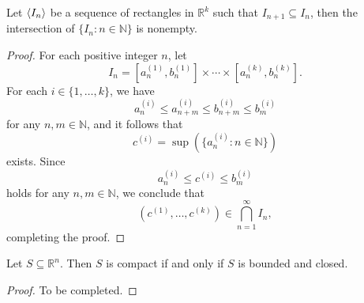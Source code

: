 \begin{theorem}
  Let $\left\langle I_n\right\rangle$ be a sequence of rectangles in $\mathbb{R}^k$ such that
  $I_{n+1} \subseteq I_n$, then the intersection of $\{I_n: n \in \mathbb{N}\}$
  is nonempty.
\end{theorem}
\begin{proof}
  For each positive integer $n$, let
  \begin{equation*}
    I_n = [a_n^{(1)}, b_n^{(1)}] \times \cdots \times
    [a_n^{(k)}, b_n^{(k)}].
  \end{equation*}
  For each $i \in \{1, \dots, k\}$, we have
  \begin{equation*}
    a_n^{(i)} \leq a_{n+m}^{(i)} \leq b_{n+m}^{(i)} \leq b_m^{(i)}
  \end{equation*}
  for any $n, m \in \mathbb{N}$, and it follows that
  \begin{equation*}
    c^{(i)} = \sup(\{a_n^{(i)}: n \in \mathbb{N}\})
  \end{equation*}
  exists.
  Since
  \begin{equation*}
    a_n^{(i)} \leq c^{(i)} \leq b_m^{(i)}
  \end{equation*}
  holds for any $n, m \in \mathbb{N}$, we conclude that
  \begin{equation*}
    (c^{(1)}, \dots, c^{(k)}) \in \bigcap_{n=1}^\infty I_n,
  \end{equation*}
  completing the proof.
\end{proof}

\begin{theorem}
  Let $S \subseteq \mathbb{R}^n$.
  Then $S$ is compact if and only if $S$ is bounded and closed.
\end{theorem}
\begin{proof}
  To be completed.
\end{proof}